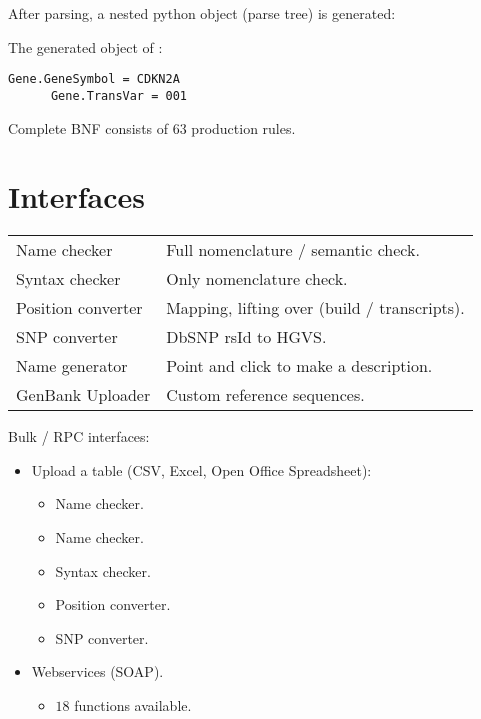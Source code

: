\documentclass[slidestop]{beamer}
\begin{document}
\begin{frame}[fragile]
  After parsing, a nested python object (parse tree) is generated:
  \bigskip
  \pause

  The generated object of :
  \begin{lstlisting}[caption = {Python object}]
      Gene.GeneSymbol = CDKN2A
      Gene.TransVar = 001
  \end{lstlisting}
  \bigskip
  \pause

  Complete BNF consists of $63$ production rules.
  \bigskip
  \medskip
  \pause

  
\end{frame}

\section{Interfaces}
\begin{frame}
  
  \begin{tabular}{l@{\ \ -\ \ }l}
    Name checker       & Full nomenclature / semantic check.\\
    Syntax checker     & Only nomenclature check.\\
    Position converter & Mapping, lifting over (build / transcripts).\\
    SNP converter      & DbSNP rsId to HGVS.\\
    Name generator     & Point and click to make a description.\\
    GenBank Uploader   & Custom reference sequences.
  \end{tabular}
  \pause
  \bigskip

  Bulk / RPC interfaces:
  \begin{itemize}
    \item Upload a table (CSV, Excel, Open Office Spreadsheet):
    \begin{itemize}
      \item Name checker.
      \item Name checker.
      \item Syntax checker.
      \item Position converter.
      \item SNP converter.
    \end{itemize}
    \item Webservices (SOAP).
    \begin{itemize}
      \item $18$ functions available.
    \end{itemize}
  \end{itemize}
\end{frame}
\end{document}
